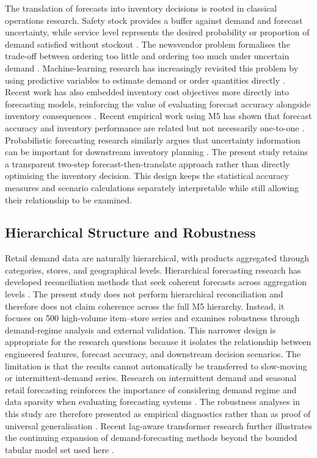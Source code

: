 The translation of forecasts into inventory decisions is rooted in classical operations research.
Safety stock provides a buffer against demand and forecast uncertainty, while service level represents the desired probability or proportion of demand satisfied without stockout \cite{Bergsma2025InventoryML}.
The newsvendor problem formalises the trade-off between ordering too little and ordering too much under uncertain demand \cite{Bergsma2025InventoryML}.
Machine-learning research has increasingly revisited this problem by using predictive variables to estimate demand or order quantities directly \cite{Bergsma2025InventoryML}.
Recent work has also embedded inventory cost objectives more directly into forecasting models, reinforcing the value of evaluating forecast accuracy alongside inventory consequences \cite{Nguyen2025TSMixerInventory,AnticipatoryShipping2025}.
Recent empirical work using M5 has shown that forecast accuracy and inventory performance are related but not necessarily one-to-one \cite{Theodorou2025Inventory}.
Probabilistic forecasting research similarly argues that uncertainty information can be important for downstream inventory planning \cite{Long2025ProbRetail,Mohammed2026Uncertainty,Retraining2025Retail,Bergsma2025InventoryML}.
The present study retains a transparent two-step forecast-then-translate approach rather than directly optimising the inventory decision.
This design keeps the statistical accuracy measures and scenario calculations separately interpretable while still allowing their relationship to be examined.

\subsection{Hierarchical Structure and Robustness}

Retail demand data are naturally hierarchical, with products aggregated through categories, stores, and geographical levels.
Hierarchical forecasting research has developed reconciliation methods that seek coherent forecasts across aggregation levels \cite{RIFT2026SupplyChain}.
The present study does not perform hierarchical reconciliation and therefore does not claim coherence across the full M5 hierarchy.
Instead, it focuses on 500 high-volume item--store series and examines robustness through demand-regime analysis and external validation.
This narrower design is appropriate for the research questions because it isolates the relationship between engineered features, forecast accuracy, and downstream decision scenarios.
The limitation is that the results cannot automatically be transferred to slow-moving or intermittent-demand series.
Research on intermittent demand and seasonal retail forecasting reinforces the importance of considering demand regime and data sparsity when evaluating forecasting systems \cite{Giannopoulos2025Intermittent,RIFT2026SupplyChain}.
The robustness analyses in this study are therefore presented as empirical diagnostics rather than as proof of universal generalisation \cite{Nguyen2025SupplyChainML,Ermochenko2026Ecommerce}.
Recent lag-aware transformer research further illustrates the continuing expansion of demand-forecasting methods beyond the bounded tabular model set used here \cite{Surana2026SparseTransformer}.

